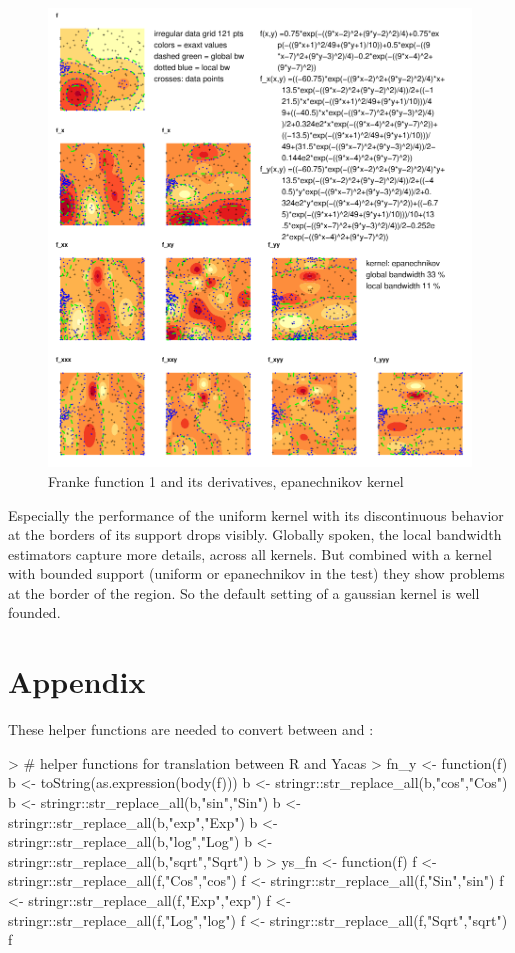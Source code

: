 \documentclass[nojss]{jss}
\begin{document}
\begin{figure}[htb]
\centering
\includegraphics{fig--050}
\caption{Franke function 1 and its derivatives, epanechnikov kernel}
\label{fig:franke12epa}
\end{figure}
Especially the performance of the uniform kernel with its
discontinuous behavior at the borders of its support drops visibly. 
Globally spoken, the local bandwidth estimators capture more details, across all
kernels. But combined with a kernel with bounded support (uniform or
epanechnikov in the test) they show problems at the border of the
region. So the default setting of a gaussian kernel is well founded.
\section{Appendix}
\label{sec:appendix}

These helper functions are needed to convert between   and  :
\begin{Schunk}
\begin{Sinput}
> # helper functions for translation between R and Yacas
> fn_y  <- function(f){
     b <- toString(as.expression(body(f)))
     b <- stringr::str_replace_all(b,"cos","Cos")
     b <- stringr::str_replace_all(b,"sin","Sin")
     b <- stringr::str_replace_all(b,"exp","Exp")
     b <- stringr::str_replace_all(b,"log","Log")
     b <- stringr::str_replace_all(b,"sqrt","Sqrt")
     b
 }
> ys_fn  <- function(f){
     f <- stringr::str_replace_all(f,"Cos","cos")
     f <- stringr::str_replace_all(f,"Sin","sin")
     f <- stringr::str_replace_all(f,"Exp","exp")
     f <- stringr::str_replace_all(f,"Log","log")
     f <- stringr::str_replace_all(f,"Sqrt","sqrt")
     f
 }
\end{Sinput}
\end{Schunk}
\end{document}
